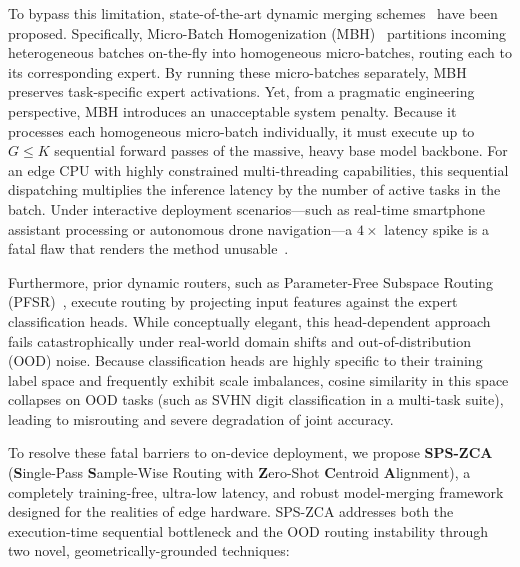 To bypass this limitation, state-of-the-art dynamic merging schemes~\cite{pfsr2025, mbh2025} have been proposed. Specifically, Micro-Batch Homogenization (MBH)~\cite{mbh2025} partitions incoming heterogeneous batches on-the-fly into homogeneous micro-batches, routing each to its corresponding expert. By running these micro-batches separately, MBH preserves task-specific expert activations.
Yet, from a pragmatic engineering perspective, MBH introduces an unacceptable system penalty. Because it processes each homogeneous micro-batch individually, it must execute up to $G \le K$ sequential forward passes of the massive, heavy base model backbone. For an edge CPU with highly constrained multi-threading capabilities, this sequential dispatching multiplies the inference latency by the number of active tasks in the batch. Under interactive deployment scenarios—such as real-time smartphone assistant processing or autonomous drone navigation—a $4\times$ latency spike is a fatal flaw that renders the method unusable~\cite{warden2019tinyml}.

Furthermore, prior dynamic routers, such as Parameter-Free Subspace Routing (PFSR)~\cite{pfsr2025}, execute routing by projecting input features against the expert classification heads. While conceptually elegant, this head-dependent approach fails catastrophically under real-world domain shifts and out-of-distribution (OOD) noise. Because classification heads are highly specific to their training label space and frequently exhibit scale imbalances, cosine similarity in this space collapses on OOD tasks (such as SVHN digit classification in a multi-task suite), leading to misrouting and severe degradation of joint accuracy.

To resolve these fatal barriers to on-device deployment, we propose \textbf{SPS-ZCA} (\textbf{S}ingle-Pass \textbf{S}ample-Wise Routing with \textbf{Z}ero-Shot \textbf{C}entroid \textbf{A}lignment), a completely training-free, ultra-low latency, and robust model-merging framework designed for the realities of edge hardware. SPS-ZCA addresses both the execution-time sequential bottleneck and the OOD routing instability through two novel, geometrically-grounded techniques:

